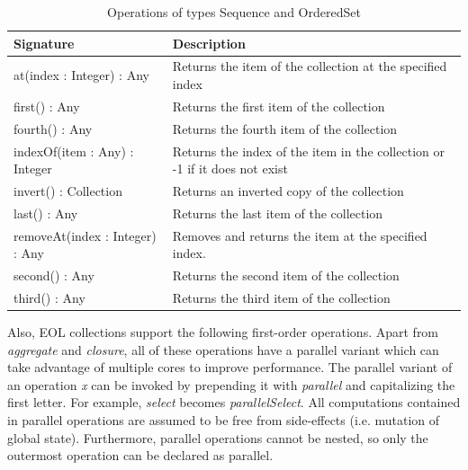 \begin{longtabu} {|p{6.5cm}|X|}
\caption{Operations of types Sequence and OrderedSet}
\label{tab:SortedOperations}\\
\hline
    \textbf{Signature} & \textbf{Description} \\\hline

    at(index : Integer) : Any & Returns the item of the collection at the specified index \\\hline
    
    first() : Any & Returns the first item of the collection  \\\hline
    
    fourth() : Any & Returns the fourth item of the collection  \\\hline
    
    indexOf(item : Any) : Integer & Returns the index of the item in the collection or -1 if it does not exist \\\hline
    
    invert() : Collection & Returns an inverted copy of the collection\\\hline
    
    last() : Any & Returns the last item of the collection  \\\hline
    
    removeAt(index : Integer) : Any & Removes and returns the item at the specified index. \\\hline
    
    second() : Any & Returns the second item of the collection  \\\hline
    
    third() : Any & Returns the third item of the collection  \\\hline
\end{longtabu}

Also, EOL collections support the following first-order operations. Apart from \emph{aggregate} and \emph{closure}, all of these operations have a parallel variant which can take advantage of multiple cores to improve performance. The parallel variant of an operation \emph{x} can be invoked by prepending it with \emph{parallel} and capitalizing the first letter. For example, \emph{select} becomes \emph{parallelSelect}. All computations contained in parallel operations are assumed to be free from side-effects (i.e. mutation of global state). Furthermore, parallel operations cannot be nested, so only the outermost operation can be declared as parallel.

